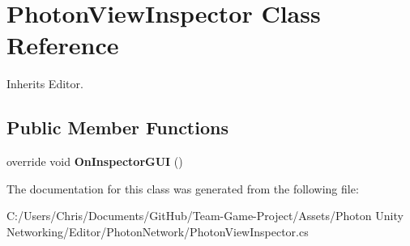 \hypertarget{class_photon_view_inspector}{}\section{Photon\+View\+Inspector Class Reference}
\label{class_photon_view_inspector}


Inherits Editor.

\subsection*{Public Member Functions}
\begin{DoxyCompactItemize}
\item 
override void {\bfseries On\+Inspector\+G\+UI} ()\hypertarget{class_photon_view_inspector_aa96f95df2145dca1d60907a4e8ca6ddd}{}\label{class_photon_view_inspector_aa96f95df2145dca1d60907a4e8ca6ddd}

\end{DoxyCompactItemize}


The documentation for this class was generated from the following file\+:\begin{DoxyCompactItemize}
\item 
C\+:/\+Users/\+Chris/\+Documents/\+Git\+Hub/\+Team-\/\+Game-\/\+Project/\+Assets/\+Photon Unity Networking/\+Editor/\+Photon\+Network/Photon\+View\+Inspector.\+cs\end{DoxyCompactItemize}
